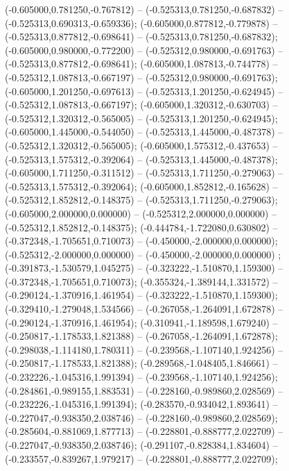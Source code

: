  (-0.605000,0.781250,-0.767812) -- (-0.525313,0.781250,-0.687832) -- (-0.525313,0.690313,-0.659336);
 (-0.605000,0.877812,-0.779878) -- (-0.525313,0.877812,-0.698641) -- (-0.525313,0.781250,-0.687832);
 (-0.605000,0.980000,-0.772200) -- (-0.525312,0.980000,-0.691763) -- (-0.525313,0.877812,-0.698641);
 (-0.605000,1.087813,-0.744778) -- (-0.525312,1.087813,-0.667197) -- (-0.525312,0.980000,-0.691763);
 (-0.605000,1.201250,-0.697613) -- (-0.525313,1.201250,-0.624945) -- (-0.525312,1.087813,-0.667197);
 (-0.605000,1.320312,-0.630703) -- (-0.525312,1.320312,-0.565005) -- (-0.525313,1.201250,-0.624945);
 (-0.605000,1.445000,-0.544050) -- (-0.525313,1.445000,-0.487378) -- (-0.525312,1.320312,-0.565005);
 (-0.605000,1.575312,-0.437653) -- (-0.525313,1.575312,-0.392064) -- (-0.525313,1.445000,-0.487378);
 (-0.605000,1.711250,-0.311512) -- (-0.525313,1.711250,-0.279063) -- (-0.525313,1.575312,-0.392064);
 (-0.605000,1.852812,-0.165628) -- (-0.525312,1.852812,-0.148375) -- (-0.525313,1.711250,-0.279063);
 (-0.605000,2.000000,0.000000) -- (-0.525312,2.000000,0.000000) -- (-0.525312,1.852812,-0.148375);
 (-0.444784,-1.722080,0.630802) -- (-0.372348,-1.705651,0.710073) -- (-0.450000,-2.000000,0.000000);
 (-0.525312,-2.000000,0.000000) -- (-0.450000,-2.000000,0.000000) ;
 (-0.391873,-1.530579,1.045275) -- (-0.323222,-1.510870,1.159300) -- (-0.372348,-1.705651,0.710073);
 (-0.355324,-1.389144,1.331572) -- (-0.290124,-1.370916,1.461954) -- (-0.323222,-1.510870,1.159300);
 (-0.329410,-1.279048,1.534566) -- (-0.267058,-1.264091,1.672878) -- (-0.290124,-1.370916,1.461954);
 (-0.310941,-1.189598,1.679240) -- (-0.250817,-1.178533,1.821388) -- (-0.267058,-1.264091,1.672878);
 (-0.298038,-1.114180,1.780311) -- (-0.239568,-1.107140,1.924256) -- (-0.250817,-1.178533,1.821388);
 (-0.289568,-1.048405,1.846661) -- (-0.232226,-1.045316,1.991394) -- (-0.239568,-1.107140,1.924256);
 (-0.284861,-0.989155,1.883531) -- (-0.228160,-0.989860,2.028569) -- (-0.232226,-1.045316,1.991394);
 (-0.283570,-0.934042,1.893641) -- (-0.227047,-0.938350,2.038746) -- (-0.228160,-0.989860,2.028569);
 (-0.285604,-0.881069,1.877713) -- (-0.228801,-0.888777,2.022709) -- (-0.227047,-0.938350,2.038746);
 (-0.291107,-0.828384,1.834604) -- (-0.233557,-0.839267,1.979217) -- (-0.228801,-0.888777,2.022709);
